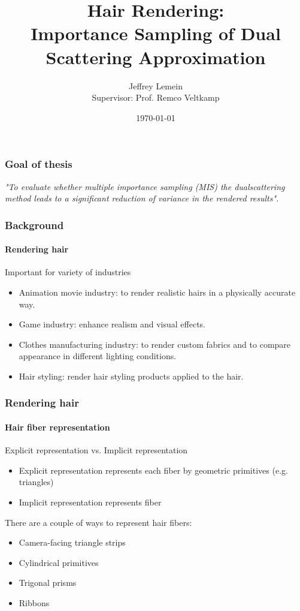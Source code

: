 \documentclass{beamer}
\begin{document}
\title[Hair Rendering]{Hair Rendering:\\ Importance
Sampling of Dual Scattering
Approximation}
\author[J. Lemein]{Jeffrey Lemein\\\small Supervisor: Prof. Remco Veltkamp \\ \hspace{18mm}}
\date{\today}

\begin{frame}
\titlepage
\end{frame}

\begin{frame}
\frametitle{Goal of thesis}
\centering
\textit{"To evaluate whether multiple importance sampling (MIS) the dualscattering method leads to a significant reduction of variance in the rendered results".}

\end{frame}


  \begin{frame}
    \frametitle{Background}
	\framesubtitle{Rendering hair}
	
	Important for variety of industries
	\begin{itemize}
	\item Animation movie industry: to render realistic hairs in a physically accurate way.
	\item Game industry: enhance realism and visual effects.
	\item Clothes manufacturing industry: to render custom fabrics and to compare appearance in different lighting conditions.
	\item Hair styling: render hair styling products applied to the hair.
	\end{itemize}
  \end{frame}
  
  \begin{frame}
    \frametitle{Rendering hair}
	\framesubtitle{Hair fiber representation}
	Explicit representation vs. Implicit representation
	
	\begin{itemize}
	\item Explicit representation represents each fiber by geometric primitives (e.g. triangles)
	\item Implicit representation represents fiber
	\end{itemize}
	
	There are a couple of ways to represent hair fibers:
	\begin{itemize}
	\item Camera-facing triangle strips
	\item Cylindrical primitives
	\item Trigonal prisms
	\item Ribbons
	\end{itemize}
	

  \end{frame}
  
\end{document}
